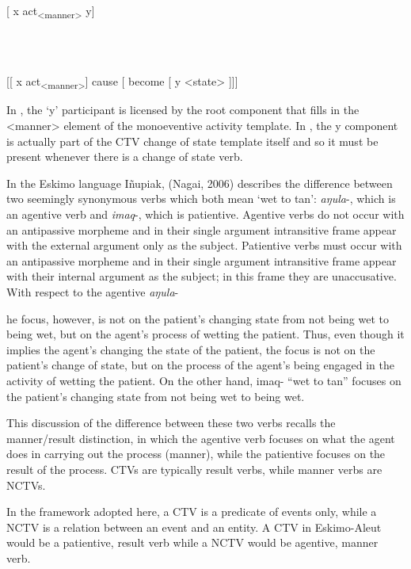 \documentclass[output=paper,modfonts,nonflat]{langsci/langscibook}
\begin{document}
          [ x act\textsubscript{<manner>} y]

\ea%
    \label{ex:key:6}
    \gll\\
        \\
    \glt
    \z

           [[ x act\textsubscript{<manner>}] cause [ become  [ y <state> ]]]

In , the ‘y’ participant is licensed by the root component that fills in the <manner> element of the monoeventive activity template.  In , the y component is actually part of the CTV change of state template itself and so it must be present whenever there is a change of state verb.

In the Eskimo language Iñupiak, (Nagai, 2006) describes the difference between two seemingly synonymous verbs which both mean ‘wet to tan’: \textit{aŋula}{}-, which is an agentive verb and \textit{imaq}{}-, which is patientive.  Agentive verbs do not occur with an antipassive morpheme and in their single argument intransitive frame appear with the external argument only as the subject.  Patientive verbs must occur with an antipassive morpheme and in their single argument intransitive frame appear with their internal argument as the subject; in this frame they are unaccusative.  With respect to the agentive \textit{aŋula}{}-

\begin{stylepi}
[t]he focus, however, is not on the patient’s changing state from not being wet to being wet, but on the agent’s process of wetting the patient. Thus, even though it implies the agent’s changing the state of the patient, the focus is not on the patient’s change of state, but on the process of the agent’s being engaged in the activity of wetting the patient. On the other hand, imaq- “wet to tan” focuses on the patient’s changing state from not being wet to being wet.
\end{stylepi}

This discussion of the difference between these two verbs recalls the manner/result distinction, in which the agentive verb focuses on what the agent does in carrying out the process (manner), while the patientive focuses on the result of the process. CTVs are typically result verbs, while manner verbs are NCTVs.

In the framework adopted here, a CTV is a predicate of events only, while a NCTV is a relation between an event and an entity.   A CTV in Eskimo-Aleut would be a patientive, result verb while a NCTV would be agentive, manner verb.
\end{document}
